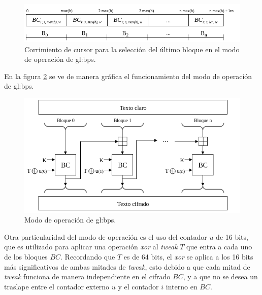 \begin{figure}
  \begin{center}
    \includegraphics[width=0.8\linewidth]
    {../../../../diagramas_comunes/bps/cursor_bps}
    \caption{Corrimiento de cursor para la selección del último
      bloque en el modo de operación de \gls{gl:bps}.}
    \label{cursor_BPS}
   \end{center}
\end{figure}

En la figura \ref{modo_de_operacion_BPS} se ve de manera gráfica el
funcionamiento del modo de operación de \gls{gl:bps}.

\begin{figure}
  \begin{center}
    \includegraphics[width=0.85\linewidth]
    {../../../../diagramas_comunes/bps/modo_de_operacion_bps}
    \caption{Modo de operación de \gls{gl:bps}.}
    \label{modo_de_operacion_BPS}
   \end{center}
\end{figure}

Otra particularidad del modo de operación es el uso del contador $u$ de 16
bits, que es utilizado para aplicar una operación \textit{xor} al
\textit{tweak} $T$ que entra a cada uno de los bloques $BC$. Recordando que $T$
es de 64 bits, el \textit{xor} se aplica a los 16 bits más significativos de
ambas mitades de \textit{tweak}, esto debido a que cada mitad de \textit{tweak}
funciona de manera independiente en el cifrado $BC$, y a que no se desea un
traslape entre el contador externo $u$ y el contador $i$ interno en $BC$.


